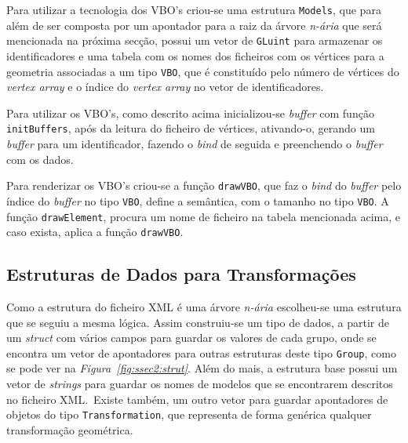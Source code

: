Para utilizar a tecnologia dos VBO's criou-se uma estrutura \texttt{Models}, que
para além de ser composta por um apontador para a raiz da árvore
\emph{n-ária} que será mencionada na próxima secção, possui um vetor de
\texttt{GLuint} para armazenar os identificadores e uma tabela com os nomes dos
ficheiros com os vértices para a geometria associadas a um tipo \texttt{VBO},
que é constituído pelo número de vértices do \emph{vertex array} e o índice do
\emph{vertex array} no vetor de identificadores.  

Para utilizar os VBO's, como descrito acima inicializou-se \emph{buffer}  com função
\texttt{initBuffers}, após da leitura do ficheiro de vértices,  ativando-o,
gerando um \emph{buffer} para um identificador, fazendo o \emph{bind} de
seguida e preenchendo o \emph{buffer} com os dados.   

Para renderizar os VBO's criou-se a função \texttt{drawVBO}, que faz
o \emph{bind} do \emph{buffer} pelo índice do \emph{buffer} no tipo
\texttt{VBO}, define a semântica, com o tamanho no tipo \texttt{VBO}.
A função \texttt{drawElement}, procura um nome de ficheiro na tabela mencionada
acima, e caso exista, aplica a função \texttt{drawVBO}.


\subsection{Estruturas de Dados para Transformações}
\label{subsec:sec2}

Como a estrutura do ficheiro XML é uma árvore \emph{n-ária} escolheu-se uma
estrutura que se seguiu a mesma lógica. Assim construiu-se um tipo de dados,
a partir de um \emph{struct} com vários campos para guardar os valores de cada
grupo, onde se encontra um vetor de apontadores para outras estruturas deste
tipo \texttt{Group}, como se pode ver na \emph{Figura~\ref{fig:ssec2:strut}}.
Além do mais, a estrutura base possui um vetor de \emph{strings} para guardar
os nomes de modelos que se encontrarem descritos no ficheiro XML.\ Existe também,
um outro vetor para guardar apontadores de objetos do tipo
\texttt{Transformation}, que representa de forma genérica qualquer transformação
geométrica.

